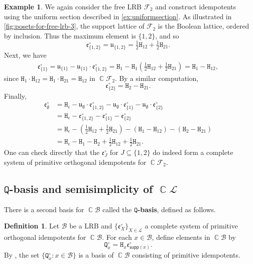 \documentclass[11pt, oneside, reqno]{amsart}
\theoremstyle{definition}
\newtheorem{definition}[theorem]{Definition}
\newtheorem{example}[theorem]{Example}
\numberwithin{equation}{section}
\DeclareMathOperator{\C}{\mathbb{C}}
\newcommand{\defn}[1]{{\color{RoyalBlue}\bf#1}}
\def \BB{{\mathcal{B}}}
\def \kk{\C}
\def \lat{{\mathcal{L}}}
\def \uu{{\mathfrak{u}}}
\def \ee{{\mathfrak{e}}}
\def \supp{\mathsf{supp}}
\newcommand{\B}[1]{\mathtt{#1}} 			%
\begin{document}
\begin{example}
We again consider the free LRB $\mathscr{F}_2$ and construct idempotents using the uniform section described in \cref{ex:uniformsection}.
As illustrated in \cref{fig:posets-for-free-lrb-3}, the support lattice of $\mathscr{F}_2$ is the Boolean lattice, ordered by inclusion.
Thus the maximum element is $\{ 1,2 \}$, and so
\[ \ee^\circ_{\{ 1,2 \}} = \uu_{\{ 1,2 \}} = \tfrac{1}{2} \B{H}_{12} + \tfrac{1}{2} \B{H}_{21}.\]
Next, we have
\begin{align*}
    \ee^\circ_{\{ 1 \}} =  \uu_{\{ 1 \}} -  \uu_{\{ 1 \}} \cdot \ee^\circ_{\{ 1,2 \}}
    = \B{H}_{1} - \B{H}_1 \left( \tfrac{1}{2} \B{H}_{12} + \tfrac{1}{2} \B{H}_{21} \right)
    = \B{H}_1 - \B{H}_{12}, 
\end{align*}
since $\B{H}_1 \cdot \B{H}_{12}  = \B{H}_1 \cdot \B{H}_{21}  = \B{H}_{12}$ in $\kk \mathscr{F}_2$.
By a similar computation,
\[ \ee^\circ_{\{ 2 \}} = \B{H}_2 - \B{H}_{21}.\]
Finally,
\begin{align*}
    \ee^\circ_{\emptyset} &= \B{H}_{\epsilon} - \uu_{\emptyset} \cdot \ee^\circ_{\{ 1, 2 \}} -  \uu_{\emptyset} \cdot \ee^\circ_{\{ 1 \}} -  \uu_{\emptyset} \cdot \ee^\circ_{\{ 2 \}} \\
    &= \B{H}_{\epsilon} -  \ee^\circ_{\{ 1, 2 \}} -   \ee^\circ_{\{ 1 \}} -  \ee^\circ_{\{ 2 \}} \\
    &= \B{H}_{\epsilon}- \left( \tfrac{1}{2} \B{H}_{12} + \tfrac{1}{2} \B{H}_{21} \right) - \left( \B{H}_1 - \B{H}_{12} \right) - \left( \B{H}_2 - \B{H}_{21} \right)\\
    &= \B{H}_{\epsilon} - \B{H}_{1} - \B{H}_{2} + \tfrac{1}{2} \B{H}_{12} + \tfrac{1}{2} \B{H}_{21}.
\end{align*}
One can check directly that the $\ee^\circ_{J}$ for $J \subseteq \{ 1,2 \}$ do indeed form a complete system of primitive orthogonal idempotents
for $\kk \mathscr{F}_2$.
\end{example}

\subsection{$\B{Q}$-basis and semisimplicity of $\C \lat$}
\label{sec:LRB-Q-basis}

There is a second basis for $\kk\BB$ called the \defn{$\B{Q}$-basis}, defined as follows.
\begin{definition}\label{def:qbasis}
    \label{prop:LRB-Q-Basis}
    Let $\BB$ be a LRB and $\{\ee^\circ_X\}_{X \in \lat}$
    a complete system of primitive orthogonal idempotents for
    $\kk \BB$.
    For each $x \in \BB$, define elements in $\kk \BB$ by
    \begin{equation} \label{eq:LRB-Q-basis}
        \B{Q}^\circ_x = \B{H}_{x} \ee^\circ_{\supp(x)}.
    \end{equation}
By \citep[Proposition 5.4]{saliola2009face},
the set
$\{\B{Q}^\circ_x : x \in \BB\}$ is a basis of $\kk \BB$
consisting of primitive idempotents.
\end{definition}
\end{document}
